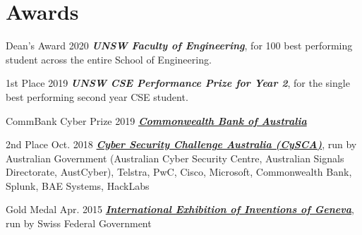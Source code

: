 \documentclass[hidelinks__VERSION__]{adamyi-cv}
\begin{document}
\section{Awards}

\begin{entrylist}


\entry
{Dean's Award}
{2020}
{\emph{\textbf{UNSW Faculty of Engineering}}, for 100 best performing student across the entire School of Engineering.}


\entry
{1st Place}
{2019}
{\emph{\textbf{UNSW CSE Performance Prize for Year 2}}, for the single best performing second year CSE student.}


\entry
{CommBank Cyber Prize}
{2019}
{\emph{\href{https://www.commbank.com.au/articles/newsroom/2020/08/tomorrow-cyber-security-talent.html}{\textbf{Commonwealth Bank of Australia}}}}


\entry
{2nd Place}
{Oct. 2018}
{\emph{\textbf{\href{https://www.cyberchallenge.com.au/}{Cyber Security Challenge Australia (CySCA)}}}, run by Australian Government (Australian Cyber Security Centre, Australian Signals Directorate, AustCyber), Telstra, PwC, Cisco, Microsoft, Commonwealth Bank, Splunk, BAE Systems, HackLabs}


\entry
{Gold Medal}
{Apr. 2015}
{\emph{\textbf{\href{https://inventions-geneva.ch/}{International Exhibition of Inventions of Geneva}}}, run by Swiss Federal Government}


\end{entrylist}

\end{document}
